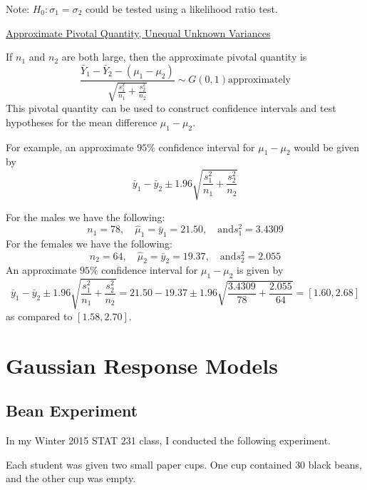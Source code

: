 Note: $ H_0:\sigma_1=\sigma_2 $ could be tested using a likelihood ratio test.

\underline{Approximate Pivotal Quantity, Unequal Unknown Variances}

If $ n_1 $ and $ n_2 $ are both large, then the approximate pivotal quantity is
\[\frac{\bar{Y}_{1}-\bar{Y}_{2}-\left(\mu_{1}-\mu_{2}\right)}{\sqrt{\frac{s_{1}^{2}}{n_{1}}+\frac{s_{2}^{2}}{n_{2}}}} \sim G(0,1) \text{approximately}\]
This pivotal quantity can be used to construct confidence intervals and test hypotheses for the
mean difference $ \mu_1-\mu_2 $.

\begin{exbox}
    \begin{example}
        For example, an approximate $ 95\% $ confidence interval for $ \mu_1-\mu_2 $ would be given
        by
        \[\bar{y}_{1}-\bar{y}_{2} \pm 1.96 \sqrt{\frac{s_{1}^{2}}{n_{1}}+\frac{s_{2}^{2}}{n_{2}}}\]
    \end{example}
\end{exbox}

\begin{exbox}
    \begin{example}
        For the males we have the following:
        \[n_{1}=78, \quad \hat{\mu}_{1}=\bar{y}_{1}=21.50, \quad \text{and} s_{1}^{2}=3.4309\]
        For the females we have the following:
        \[n_{2}=64, \quad \hat{\mu}_{2}=\bar{y}_{2}=19.37, \quad \text{and} s_{2}^{2}=2.055\]
        An approximate $ 95\% $ confidence interval for $ \mu_1-\mu_2 $ is given by
        \[\bar{y}_{1}-\bar{y}_{2} \pm 1.96 \sqrt{\frac{s_{1}^{2}}{n_{1}}+\frac{s_{2}^{2}}{n_{2}}}=21.50-19.37 \pm 1.96 \sqrt{\frac{3.4309}{78}+\frac{2.055}{64}}=[1.60,2.68]\]
        as compared to $ [1.58,2.70] $.
    \end{example}
\end{exbox}

\section{Gaussian Response Models}
\subsection{Bean Experiment}
In my Winter 2015 STAT 231 class, I conducted the following experiment.

Each student was given two small paper cups. One cup contained $30$ black beans, and
the other cup was empty.

